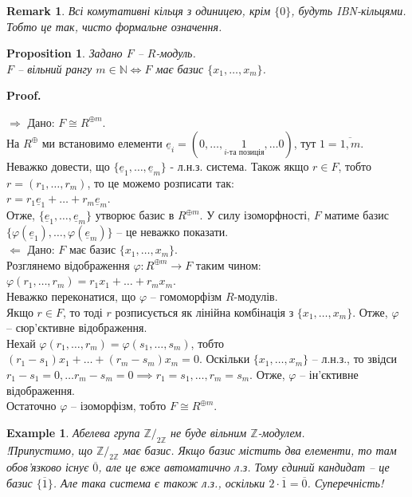 \documentclass[a4paper, 10pt]{article}
\makeatletter
\def\rightproof{$\boxed{\Rightarrow}$ }
\def\leftproof{$\boxed{\Leftarrow}$ }
\theoremstyle{theoremdd}
\theoremstyle{theoremdd}
\theoremstyle{theoremdd}
\theoremstyle{theoremdd}
\theoremstyle{theoremdd}
\newtheorem{example}[theorem]{Example}
\theoremstyle{theoremdd}
\theoremstyle{theoremdd}
\theoremstyle{theoremdd}
\theoremstyle{theoremdd}
\newtheorem{proposition}[theorem]{Proposition}
\theoremstyle{theoremdd}
\theoremstyle{theoremdd}
\newtheorem{remark}[theorem]{Remark}
\theoremstyle{theoremdd}
\theoremstyle{theoremdd}
\theoremstyle{theoremdd}
\theoremstyle{theoremdd}
\renewenvironment{proof}[1][Proof.\\]{\par
\pushQED{\hfill \qed}%
\normalfont \topsep6\p@\@plus6\p@\relax
\trivlist
\item\relax
{\bfseries
#1\@addpunct{.}}\hspace\labelsep\ignorespaces
}{%
\popQED\endtrivlist\@endpefalse
}
\makeatother
\begin{document}
\begin{remark}
Всі комутативні кільця з одиницею, крім $\{0\}$, будуть IBN-кільцями. Тобто це так, чисто формальне означення.
\end{remark}

\begin{proposition}
Задано $F$ -- $R$-модуль.\\
$F$ -- вільний рангу $m \in \mathbb{N} \iff F$ має базис $\{x_1,\dots,x_m\}$.
\end{proposition}

\begin{proof}
\rightproof Дано: $F \cong R^{\oplus m}$. \\
На $R^{\oplus}$ ми встановимо елементи $\underline{e}_i = (0,\dots,\underset{i\text{-та позиція}}{1}, \dots 0)$, тут $1 = \overline{1,m}$. Неважко довести, що $\{\underline{e}_1,\dots,\underline{e}_m\}$ - л.н.з. система. Також якщо $r \in F$, тобто $r = (r_1,\dots,r_m)$, то це можемо розписати так:\\
$r = r_1 \underline{e}_1 + \dots + r_m \underline{e}_m$.\\
Отже, $\{\underline{e}_1,\dots,\underline{e}_m\}$ утворює базис в $R^{\oplus m}$. У силу ізоморфності, $F$ матиме базис $\{\varphi(\underline{e}_1),\dots,\varphi(\underline{e}_m)\}$ -- це неважко показати.
\bigskip \\
\leftproof Дано: $F$ має базис $\{x_1,\dots,x_m\}$. \\
Розглянемо відображення $\varphi \colon R^{\oplus m} \to F$ таким чином:\\
$\varphi(r_1,\dots,r_m) = r_1x_1 + \dots + r_m x_m$.\\
Неважко переконатися, що $\varphi$ -- гомоморфізм $R$-модулів.\\
Якщо $r \in F$, то тоді $r$ розписується як лінійна комбінація з $\{x_1,\dots,x_m\}$. Отже, $\varphi$ -- сюр'єктивне відображення.\\
Нехай $\varphi(r_1,\dots,r_m) = \varphi(s_1,\dots,s_m)$, тобто $(r_1-s_1)x_1 + \dots + (r_m-s_m)x_m = 0$. Оскільки $\{x_1,\dots,x_m\}$ -- л.н.з., то звідси $r_1-s_1 = 0,\dots r_m-s_m=0 \implies r_1 = s_1, \dots, r_m = s_m$. Отже, $\varphi$ -- ін'єктивне відображення.\\
Остаточно $\varphi$ -- ізоморфізм, тобто $F \cong R^{\oplus m}$.
\end{proof}

\begin{example}
Абелева група $\mathbb{Z}/_{2 \mathbb{Z}}$ не буде вільним $\mathbb{Z}$-модулем.\\
!Припустимо, що $\mathbb{Z}/_{2 \mathbb{Z}}$ має базис. Якщо базис містить два елементи, то там обов'язково існує $\overline{0}$, але це вже автоматично л.з. Тому єдиний кандидат -- це базис $\{\overline{1}\}$. Але така система є також л.з., оскільки $2 \cdot \overline{1} = \overline{0}$. Суперечність!
\end{example}
\end{document}
